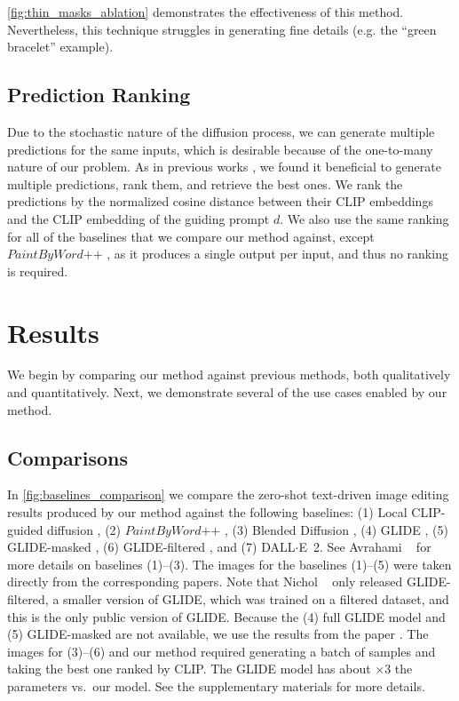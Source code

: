 \ref{fig:thin_masks_ablation} demonstrates the effectiveness of this method. Nevertheless, this technique struggles in generating fine details (e.g. the ``green bracelet'' example).

\subsection{Prediction Ranking}
\label{sec:predictions_ranking}

Due to the stochastic nature of the diffusion process, we can generate multiple predictions for the same inputs, which is desirable because of the one-to-many nature of our problem. As in previous works \cite{razavi2019generating, ramesh2021zero,avrahami2022blended}, we found it beneficial to generate multiple predictions, rank them, and retrieve the best ones. We rank the predictions by the normalized cosine distance between their CLIP embeddings and the CLIP embedding of the guiding prompt $d$. We also use the same ranking for all of the baselines that we compare our method against, except $\textit{PaintByWord++}$ \cite{bau2021paint, crowson2022vqgan}, as it produces a single output per input, and thus no ranking is required.

\section{Results}
\label{sec:results}

We begin by comparing our method against previous methods, both qualitatively and quantitatively. Next, we demonstrate several of the use cases enabled by our method.

\subsection{Comparisons}
In \ref{fig:baselines_comparison} we compare the zero-shot text-driven image editing results produced by our method against the following baselines: (1) Local CLIP-guided diffusion \cite{clip_guided_diffusion}, (2) $\textit{PaintByWord++}$ \cite{bau2021paint, crowson2022vqgan}, (3) Blended Diffusion \cite{avrahami2022blended}, (4) GLIDE \cite{nichol2021glide}, (5) GLIDE-masked \cite{nichol2021glide}, (6) GLIDE-filtered \cite{nichol2021glide}, and (7) {DALL$\cdot$E}~2.
See Avrahami \etal~ for more details on baselines (1)--(3). The images for the baselines (1)--(5) were taken directly from the corresponding papers. Note that Nichol \etal~ only released GLIDE-filtered, a smaller version of GLIDE, which was trained on a filtered dataset, and this is the only public version of GLIDE. Because the (4) full GLIDE model and (5) GLIDE-masked are not available, we use the results from the paper \cite{nichol2021glide}. The images for (3)--(6) and our method required generating a batch of samples and taking the best one ranked by CLIP. The GLIDE model has about $\times 3$ the parameters vs.~our model. See the supplementary materials for more details.

